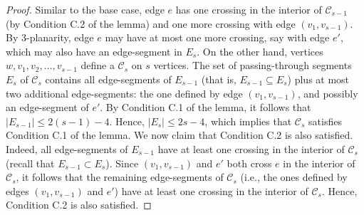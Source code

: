 \begin{proof}
Similar to the base case, edge $e$ has one crossing in the interior of $\mathcal{C}_{s-1}$ (by Condition C.2 of the lemma) and one more crossing with edge $(v_1,v_{s-1})$. By $3$-planarity, edge $e$ may have at most one more crossing, say with edge $e'$, which may also have an edge-segment in $E_s$. On the other hand, vertices $w,v_1,v_2,\dots,v_{s-1}$ define a \pp $\mathcal{C}_{s}$ on $s$ vertices. The set of passing-through segments $E_{s}$ of $\mathcal{C}_{s}$ contains all edge-segments of $E_{s-1}$ (that is, $E_{s-1} \subseteq E_s$) plus at most two additional edge-segments: the one defined by edge $(v_1,v_{s-1})$, and possibly an edge-segment of $e'$. By Condition C.1 of the lemma, it follows that $|E_{s-1}| \leq 2(s-1)-4$. Hence, $|E_{s}| \leq 2s-4$, which implies that $\mathcal{C}_{s}$ satisfies Condition C.1 of the lemma. We now claim that Condition C.2 is also satisfied. Indeed, all edge-segments of $E_{s-1}$ have at least one crossing in the interior of $\mathcal{C}_s$ (recall that $E_{s-1}\subset E_s$). Since $(v_1,v_{s-1})$ and $e'$ both cross $e$ in the interior of $\mathcal{C}_s$, it follows that the remaining edge-segments of $\mathcal{C}_s$ (i.e., the ones defined by edges $(v_1,v_{s-1})$ and $e'$) have at least one crossing in the interior of $\mathcal{C}_s$. Hence, Condition C.2 is also satisfied. 


\end{proof}
